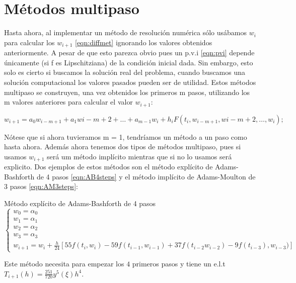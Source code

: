 \section{Métodos multipaso}
Hasta ahora, al implementar un método de resolución numérica sólo usábamos 
$w_i$ para calcular los $w_{i+1}$ \ref{eqn:diffmet} ignorando los valores obtenidos 
anteriormente. A pesar de que esto parezca obvio pues un p.v.i \ref{eqn:pvi} 
depende únicamente (si f es Lipschitziana) de la condición inicial dada. 
Sin embargo, esto solo es cierto si buscamos la solución real del problema, 
cuando buscamos una solución computacional los valores pasados pueden ser de utilidad.
Estos métodos multipaso se construyen, una vez obtenidos los primeros m pasos, 
utilizando los m valores anteriores para calcular el valor $w_{i+1}$:

\begin{equation} \label{eqn:multistep}
w_{i+1} = a_0w_{i-m+1} + a_1w{i-m+2} + \dots + a_{m-1}w_i + h_iF(t_i,w_{i-m+1},w{i-m+2},\dots,w_i);
\end{equation}

Nótese que si ahora tuvieramos m = 1, tendríamos un método a un paso como hasta ahora. 
Además ahora tenemos dos tipos de métodos multipaso, pues si usamos $w_{i+1}$ 
será um método implícito mientras que si no lo usamos será explicito.
Dos ejemplos de estos métodos son el método explícito de Adams-Bashforth 
de 4 pasos \ref{eqn:AB4steps} y el método implícito de Adams-Moulton de 
3 pasos \ref{eqn:AM3steps}:%

\begin{method} 
    Método explícito de Adams-Bashforth de 4 pasos
    \begin{equation} \label{eqn:AB4steps}
        \begin{cases}
            w_0 = \alpha_0  \\
            w_1 = \alpha_1  \\
            w_2 = \alpha_2  \\
            w_3 = \alpha_3  \\
            w_{i+1} = w_i + \frac{h}{24}[
                    55f(t_i,w_i) - 59f(t_{i-1},w_{i-1}) + 37f(t_{i-2}w_{i-2}) - 9f(t_{i-3}),w_{i-3})
                    ]
        \end{cases}
    \end{equation}
\end{method}
    
Este método necesita para empezar los $4$ primeros pasos y 
tiene un e.l.t $T_{i+1}(h) = \frac{251}{720}y^5(\xi)h^4$. %



